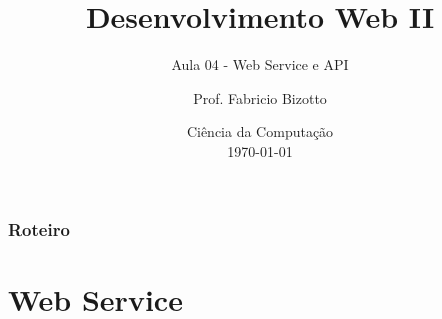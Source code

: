 \documentclass[
	9pt, %
	t, %
]{beamer}
\title[DesWebII]{Desenvolvimento Web II} %
\subtitle{Aula 04 - Web Service e API} %
\author[Fabricio Bizotto]{Prof. Fabricio Bizotto} %
\institute[IFC]{Instituto Federal Catarinense \\ \smallskip \textit{fabricio.bizotto@ifc.edu.br}} %
\date[\today]{Ciência da Computação \\ \today} %
\begin{document}

\begin{frame}
	\titlepage %
\end{frame}


\begin{frame}
	\frametitle{Roteiro} %

	\tableofcontents %
\end{frame}


\section{Web Service} %

\end{document}
